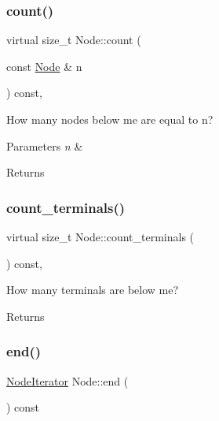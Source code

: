 \subsubsection{\texorpdfstring{count()}{count()}\hspace{0.1cm}{\footnotesize\ttfamily [2/2]}}
{\footnotesize\ttfamily virtual size\+\_\+t Node\+::count (\begin{DoxyParamCaption}\item[{const \hyperlink{class_node}{Node} \&}]{n }\end{DoxyParamCaption}) const\hspace{0.3cm}{\ttfamily [inline]}, {\ttfamily [virtual]}}

How many nodes below me are equal to n? 
\begin{DoxyParams}{Parameters}
{\em n} & \\
\hline
\end{DoxyParams}
\begin{DoxyReturn}{Returns}

\end{DoxyReturn}
\mbox{\label{class_node_a70c820eaeaa852e3c0a46cf006026c1b}} 
\subsubsection{\texorpdfstring{count\+\_\+terminals()}{count\_terminals()}}
{\footnotesize\ttfamily virtual size\+\_\+t Node\+::count\+\_\+terminals (\begin{DoxyParamCaption}{ }\end{DoxyParamCaption}) const\hspace{0.3cm}{\ttfamily [inline]}, {\ttfamily [virtual]}}

How many terminals are below me? \begin{DoxyReturn}{Returns}

\end{DoxyReturn}
\mbox{\label{class_node_aea7c6e778d4720fb8071af71c57b1628}} 
\subsubsection{\texorpdfstring{end()}{end()}}
{\footnotesize\ttfamily \hyperlink{class_node_1_1_node_iterator}{Node\+Iterator} Node\+::end (\begin{DoxyParamCaption}{ }\end{DoxyParamCaption}) const\hspace{0.3cm}{\ttfamily [inline]}}

